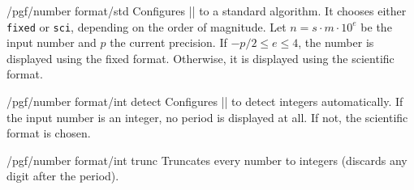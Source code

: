 \begin{key}{/pgf/number format/std}
Configures |\pgfmathprintnumber| to a standard algorithm. It chooses either \texttt{fixed} or \texttt{sci}, depending on the order of magnitude. Let $n=s \cdot m \cdot 10^e$ be the input number and $p$ the current precision. If $-p/2 \le e \le 4$, the number is displayed using the fixed format. Otherwise, it is displayed using the scientific format. 

\begin{codeexample}[]
\hspace{1em}
\hspace{1em}
\hspace{1em}
\hspace{1em}
\end{codeexample}
\end{key}

\begin{key}{/pgf/number format/int detect}
Configures |\pgfmathprintnumber| to detect integers automatically. If the input number is an integer, no period is displayed at all. If not, the scientific format is chosen.

\begin{codeexample}[]
\hspace{1em}
\hspace{1em}
\hspace{1em}
\hspace{1em}
\end{codeexample}
\end{key}

\begin{key}{/pgf/number format/int trunc}
Truncates every number to integers (discards any digit after the period).

\begin{codeexample}[]
\hspace{1em}
\hspace{1em}
\hspace{1em}
\hspace{1em}
\end{codeexample}
\end{key}

